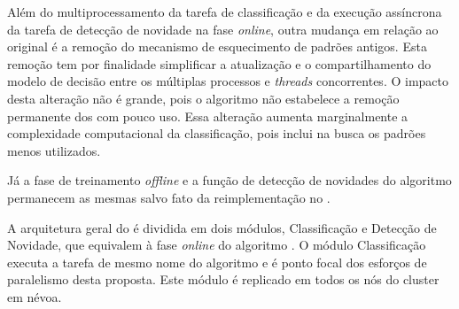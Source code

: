 Além do multiprocessamento da tarefa de classificação e da execução assíncrona da
tarefa de detecção de novidade na fase \emph{online}, outra mudança em relação
ao \minas original é a remoção do mecanismo de esquecimento de padrões antigos.
Esta remoção tem por finalidade simplificar a atualização e o compartilhamento
do modelo de decisão entre os múltiplas processos e \emph{threads} concorrentes.
% 
O impacto desta alteração não é grande, pois o algoritmo \minas não estabelece a
remoção permanente dos \mclusters com pouco uso.
Essa alteração aumenta marginalmente a complexidade computacional da
classificação, pois inclui na busca os padrões menos utilizados.

Já a fase de treinamento \emph{offline} e a função de detecção de novidades do
algoritmo \minas permanecem as mesmas salvo fato da reimplementação no \mfog.



A arquitetura geral do \mfog é dividida em dois módulos, Classificação e
Detecção de Novidade, que equivalem à fase \emph{online} do algoritmo \minas.
O módulo Classificação executa a tarefa de mesmo nome do algoritmo \minas e é
ponto focal dos esforços de paralelismo desta proposta.
Este módulo é replicado em todos os nós do cluster %
em névoa.

